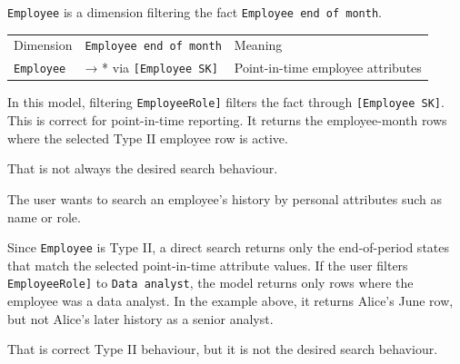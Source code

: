 \documentclass[10pt,openany,10pt]{book}
\newcounter{none}
\let\podeToprule\toprule
\let\podeMidrule\midrule
\let\podeBottomrule\bottomrule
\renewcommand{\toprule}{\arrayrulecolor{pbiGrid}\podeToprule}
\renewcommand{\midrule}{\arrayrulecolor{pbiGrid}\podeMidrule}
\renewcommand{\bottomrule}{\arrayrulecolor{pbiGrid}\podeBottomrule}
\begin{document}
\texttt{\textquotesingle{}Employee\textquotesingle{}} is a dimension
filtering the fact
\texttt{\textquotesingle{}Employee\ end\ of\ month\textquotesingle{}}.

{\def\LTcaptype{none} %
\begin{longtable}[]{@{}
  >{\raggedright\arraybackslash}p{}
  >{\raggedright\arraybackslash}p{}
  >{\raggedright\arraybackslash}p{}@{}}
\toprule\noalign{}
\begin{minipage}[b]{\linewidth}\raggedright
Dimension
\end{minipage} & \begin{minipage}[b]{\linewidth}\raggedright
\texttt{\textquotesingle{}Employee\ end\ of\ month\textquotesingle{}}
\end{minipage} & \begin{minipage}[b]{\linewidth}\raggedright
Meaning
\end{minipage} \\
\midrule\noalign{}
\endhead
\bottomrule\noalign{}
\endlastfoot
\texttt{\textquotesingle{}Employee\textquotesingle{}} & 1 → * via
\texttt{{[}Employee\ SK{]}} & Point-in-time employee attributes \\
\end{longtable}
}

In this model, filtering
\texttt{\textquotesingle{}Employee\textquotesingle{}{[}Role{]}} filters
the fact through \texttt{{[}Employee\ SK{]}}. This is correct for
point-in-time reporting. It returns the employee-month rows where the
selected Type II employee row is active.

That is not always the desired search behaviour.

The user wants to search an employee's history by personal attributes
such as name or role.

Since \texttt{\textquotesingle{}Employee\textquotesingle{}} is Type II,
a direct search returns only the end-of-period states that match the
selected point-in-time attribute values. If the user filters
\texttt{\textquotesingle{}Employee\textquotesingle{}{[}Role{]}} to
\texttt{Data\ analyst}, the model returns only rows where the employee
was a data analyst. In the example above, it returns Alice's June row,
but not Alice's later history as a senior analyst.

That is correct Type II behaviour, but it is not the desired search
behaviour.
\end{document}
